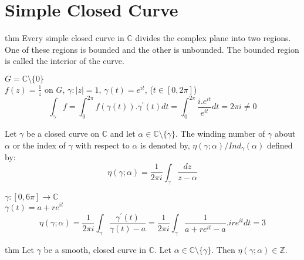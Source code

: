 \section{\textbf{Simple Closed Curve}}
\begin{restatable}{thm}{}\label{}
Every simple closed curve in $\mathds{C}$ divides the complex plane into two regions. One of these regions is bounded and the other is unbounded. The bounded region is called the interior of the curve.
\end{restatable}
\begin{ex}
$G=\mathds{C}\setminus \{0\}$\\
$f(z)=\frac{1}{z}$ on $G$, $\gamma: |z|=1$, $\gamma(t)=e^{it}$, ($t\in [0,2\pi]$)\\
$$\int_{\gamma}^{} f= \int_{0}^{2\pi} f(\gamma(t)).\gamma^{'}(t) dt= \int_{0}^{2\pi} \frac{i.e^{it}}{e^{it}} dt =2\pi i\neq 0$$
\end{ex}
\begin{defn}
Let $\gamma$ be a closed curve on $\mathds{C}$ and let $\alpha \in \mathds{C}\setminus \{\gamma\}$. The winding number of $\gamma$ about $\alpha$ or the index of $\gamma$ with respect to $\alpha$ is denoted by,
$\eta(\gamma;\alpha)/Ind_{\gamma}(\alpha)$ defined by:\\
$$\eta(\gamma;\alpha)=\frac{1}{2\pi i}\int_{\gamma}^{}\frac{dz}{z-\alpha}$$
\end{defn}
\begin{ex}
$\gamma: [0,6\pi]\rightarrow \mathds{C}$ \\
$\gamma(t)=a+re^{it}$ \\
$$\eta(\gamma;\alpha)=\frac{1}{2\pi i}\int_{\gamma}^{} \frac{\gamma^{'}(t)}{\gamma(t)-a}=\frac{1}{2\pi i}\int_{\gamma}^{} \frac{1}{a+re^{it}-a}.ire^{it} dt=3$$
\end{ex}
\begin{restatable}[]{thm}{}\label{}
Let $\gamma$ be a smooth, closed curve in $\mathds{C}$. Let $\alpha\in \mathds{C}\setminus \{\gamma\}$. Then $\eta(\gamma;\alpha)\in \mathds{Z}$.
\end{restatable}
